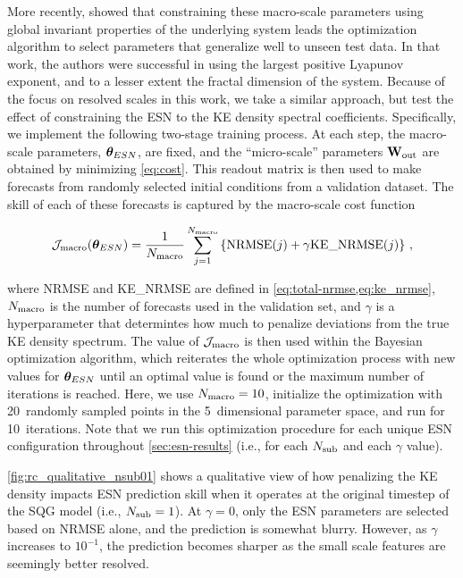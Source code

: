 More recently, 
showed that constraining these macro-scale
parameters using global invariant properties of the underlying system leads the
optimization algorithm to select parameters that generalize well to unseen test data. In that work, the authors were successful in using the largest positive
Lyapunov exponent, and to a lesser extent the fractal dimension of the system.
Because of the focus on resolved scales in this work, we take a similar approach, but test the effect of constraining the ESN to the KE density spectral coefficients.
Specifically, we implement the following two-stage training process.
At each step, the macro-scale parameters, $\bm{\theta}_{ESN}$, are fixed, and the
``micro-scale'' parameters $\mathbf{W}_\text{out}$ are obtained by minimizing \cref{eq:cost}.
This readout matrix is then used to make forecasts from randomly selected
initial conditions from a validation dataset.
The skill of each of these forecasts is captured by the macro-scale cost
function
\begin{linenomath*}\begin{equation}
    \mathcal{J}_\text{macro}(\bm{\theta}_{ESN}) = \dfrac{1}{N_\text{macro}}
    \sum_{j=1}^{N_\text{macro}}
    \left\{
        \text{NRMSE}(j) + \gamma \text{KE\_NRMSE}(j)
    \right\}
    \label{eq:macro-cost} \, ,
\end{equation}\end{linenomath*}
where NRMSE and KE\_NRMSE are defined in \cref{eq:total-nrmse,eq:ke_nrmse},
$N_\text{macro}$ is the number of forecasts used in the validation set, and $\gamma$ is
a hyperparameter that determintes how much to penalize deviations
from the true KE density spectrum.
The value of $\mathcal{J}_\text{macro}$ is then used within the Bayesian optimization algorithm, which reiterates the whole optimization process with new values for
$\bm{\theta}_{ESN}$ until an optimal value is found or the maximum number of iterations is reached.
Here, we use $N_\text{macro}=10$, initialize the optimization with 20~randomly sampled points in the 5~dimensional parameter space, and run for 10~iterations. Note that we run this optimization procedure for each unique ESN configuration
throughout \cref{sec:esn-results} (i.e., for each $N_\text{sub}$ and each $\gamma$
value).

\cref{fig:rc_qualitative_nsub01} shows a qualitative view of how penalizing the
KE density impacts ESN prediction skill when it operates at the original
timestep of the SQG model (i.e., $N_\text{sub}=1$).
At $\gamma=0$, only the ESN parameters are selected based on NRMSE alone, and
the prediction is somewhat blurry.
However, as $\gamma$ increases to $10^{-1}$, the prediction becomes sharper as
the small scale features are seemingly better resolved.

